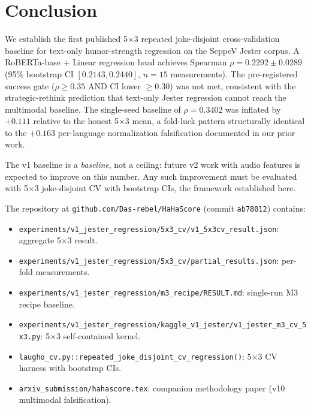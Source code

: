 \documentclass[11pt, letterpaper]{article}
\begin{document}
\section{Conclusion}

We establish the first published 5$\times$3 repeated joke-disjoint cross-validation baseline for text-only humor-strength regression on the SeppeV Jester corpus. A RoBERTa-base + Linear regression head achieves Spearman $\rho = 0.2292 \pm 0.0289$ (95\% bootstrap CI $[0.2143, 0.2440]$, $n=15$ measurements). The pre-registered success gate ($\rho \geq 0.35$ AND CI lower $\geq 0.30$) was not met, consistent with the strategic-rethink prediction that text-only Jester regression cannot reach the multimodal baseline. The single-seed baseline of $\rho = 0.3402$ was inflated by $+0.111$ relative to the honest 5$\times$3 mean, a fold-luck pattern structurally identical to the $+0.163$ per-language normalization falsification documented in our prior work.

The v1 baseline is a \emph{baseline}, not a ceiling: future v2 work with audio features is expected to improve on this number. Any such improvement must be evaluated with 5$\times$3 joke-disjoint CV with bootstrap CIs, the framework established here.


The repository at \texttt{github.com/Das-rebel/HaHaScore} (commit \texttt{ab78012}) contains:

\begin{itemize}
\item \texttt{experiments/v1\_jester\_regression/5x3\_cv/v1\_5x3cv\_result.json}: aggregate 5$\times$3 result.
\item \texttt{experiments/v1\_jester\_regression/5x3\_cv/partial\_results.json}: per-fold measurements.
\item \texttt{experiments/v1\_jester\_regression/m3\_recipe/RESULT.md}: single-run M3 recipe baseline.
\item \texttt{experiments/v1\_jester\_regression/kaggle\_v1\_jester/v1\_jester\_m3\_cv\_5x3.py}: 5$\times$3 self-contained kernel.
\item \texttt{laugho\_cv.py::repeated\_joke\_disjoint\_cv\_regression()}: 5$\times$3 CV harness with bootstrap CIs.
\item \texttt{arxiv\_submission/hahascore.tex}: companion methodology paper (v10 multimodal falsification).
\end{itemize}
\end{document}

